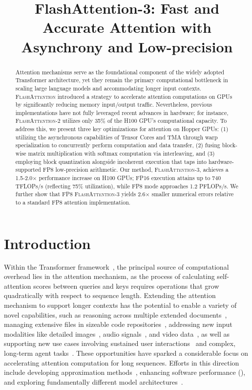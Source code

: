 \title{FlashAttention-3: Fast and Accurate Attention with Asynchrony and Low-precision}

\begin{abstract}
Attention mechanisms serve as the foundational component of the widely adopted Transformer architecture, yet they remain the primary computational bottleneck in scaling large language models and accommodating longer input contexts. \textsc{FlashAttention} introduced a strategy to accelerate attention computations on GPUs by significantly reducing memory input/output traffic. Nevertheless, previous implementations have not fully leveraged recent advances in hardware; for instance, \textsc{FlashAttention-2} utilizes only 35\% of the H100 GPU’s computational capacity. To address this, we present three key optimizations for attention on Hopper GPUs: (1) utilizing the asynchronous capabilities of Tensor Cores and TMA through warp specialization to concurrently perform computation and data transfer, (2) fusing block-wise matrix multiplication with softmax computation via interleaving, and (3) employing block quantization alongside incoherent execution that taps into hardware-supported FP8 low-precision arithmetic. Our method, \textsc{FlashAttention-3}, achieves a 1.5-2.0$\times$ performance increase on H100 GPUs; FP16 execution attains up to 740 TFLOPs/s (reflecting 75\% utilization), while FP8 mode approaches 1.2 PFLOPs/s. We further show that FP8 \textsc{FlashAttention-3} yields 2.6$\times$ smaller numerical errors relative to a standard FP8 attention implementation.
\end{abstract}

\section{Introduction}
\label{sec:intro}

Within the Transformer framework~\citep{vaswani2017attention}, the principal source of computational overhead lies in the attention mechanism, as the process of calculating self-attention scores between queries and keys requires operations that grow quadratically with respect to sequence length. Extending the attention mechanism to support longer contexts has the potential to enable a variety of novel capabilities, such as reasoning across multiple extended documents~\citep{guo2021longt5,shaham2022scrolls,peng2023yarn}, managing extensive files in sizeable code repositories~\citep{roziere2023code, li2023starcoder}, addressing new input modalities like detailed images~\citep{chen2022scaling}, audio signals~\citep{gulati2020conformer}, and video data~\citep{ho2022video}, as well as supporting new use cases involving sustained user interactions~\citep{sun2019bert4rec} and complex, long-term agent tasks~\citep{yao2022react}. These opportunities have sparked a considerable focus on accelerating attention computation for long sequences. Efforts in this direction include developing approximation methods~\citep{katharopoulos2020transformers,choromanski2020rethinking, tay2020efficient}, enhancing software performance (\citep{rabe2021self,dao2022flashattention,kwon2023efficient}), and exploring fundamentally different model architectures~\citep{peng2023rwkv,sun2023retentive,gu2023mamba}.

